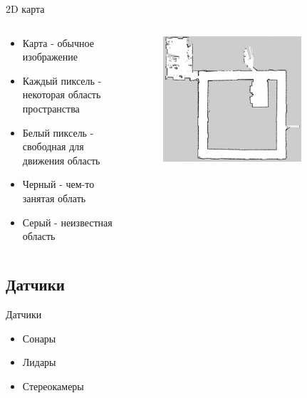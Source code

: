\documentclass[9pt]{beamer}
\begin{document}
\begin{frame}{2D карта}
\begin{columns}
  \begin{column}{0.50\textwidth}
    \begin{itemize}
      \item
      {
        Карта - обычное изображение
      }
      \item
      {
        Каждый пиксель - некоторая область пространства
      }
      \item
      {
        Белый пиксель - свободная для движения область
      }
      \item
      {
        Черный - чем-то занятая облать
      }
      \item
      {
        Серый - неизвестная область
      }
    \end{itemize}
  \end{column}
  \begin{column}{0.50\textwidth}
    \begin{figure}[h]
      \centering
      \includegraphics[width=0.8\textwidth]{grid_map.png}
    \end{figure}
  \end{column}
\end{columns}
\end{frame}

\subsection{Датчики}

\begin{frame}{Датчики}

\begin{itemize}
  \item
  {
    Сонары
  }
  \item
  {
    Лидары
  }
  \item
  {
    Стереокамеры
  }
\end{itemize}

\end{frame}
\end{document}
